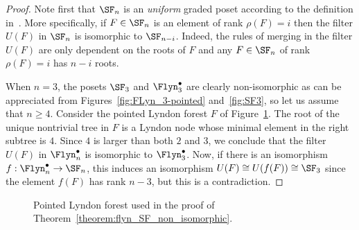 \begin{proof}
Note first that $\SF_n$ is an \emph{uniform} graded poset according to the definition in~\cite{Gonzalez2016}. More specifically, if $F\in \SF_n$ is an element of rank $\rho(F)=i$ then the filter $U(F)$ in $\SF_n$ is isomorphic to $\SF_{n-i}$. Indeed, the rules of merging in the filter $U(F)$ are only dependent on the roots of $F$ and any $F\in \SF_n$ of rank $\rho(F)=i$ has $n-i$ roots.

When $n=3$, the posets $\SF_3$ and $\Flyn^\bullet_{3}$ are clearly non-isomorphic as can be appreciated from Figures~\ref{fig:FLyn_3-pointed} and~\ref{fig:SF3},  so let us assume that $n\ge 4$.
Consider the pointed Lyndon forest $F$ of Figure~\ref{fig:pointed_forest_counterexample}. The root of the unique nontrivial tree in $F$ is a Lyndon node whose minimal element in the right subtree is $4$. Since $4$ is larger than both $2$ and $3$, we conclude that the filter $U(F)$ in $\Flyn_{n}^{\bullet}$ is isomorphic to $\Flyn^\bullet_{3}$.  Now, if there is an isomorphism $f:\Flyn_{n}^{\bullet}\rightarrow \SF_n$, this induces an isomorphism $U(F)\cong U(f(F))\cong \SF_3$ since the element $f(F)$ has rank $n-3$, but this is a contradiction.
\end{proof}

    \begin{figure}
     \centering
     \caption{Pointed Lyndon forest used in the proof of Theorem~\ref{theorem:flyn_SF_non_isomorphic}.}
     \label{fig:pointed_forest_counterexample}
 \end{figure}

